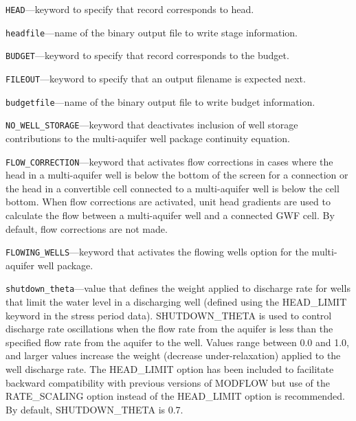 \begin{description}
\item \texttt{HEAD}---keyword to specify that record corresponds to head.

\item \texttt{headfile}---name of the binary output file to write stage information.

\item \texttt{BUDGET}---keyword to specify that record corresponds to the budget.

\item \texttt{FILEOUT}---keyword to specify that an output filename is expected next.

\item \texttt{budgetfile}---name of the binary output file to write budget information.

\item \texttt{NO\_WELL\_STORAGE}---keyword that deactivates inclusion of well storage contributions to the multi-aquifer well package continuity equation.

\item \texttt{FLOW\_CORRECTION}---keyword that activates flow corrections in cases where the head in a multi-aquifer well is below the bottom of the screen for a connection or the head in a convertible cell connected to a multi-aquifer well is below the cell bottom. When flow corrections are activated, unit head gradients are used to calculate the flow between a multi-aquifer well and a connected GWF cell. By default, flow corrections are not made.

\item \texttt{FLOWING\_WELLS}---keyword that activates the flowing wells option for the multi-aquifer well package.

\item \texttt{shutdown\_theta}---value that defines the weight applied to discharge rate for wells that limit the water level in a discharging well (defined using the HEAD\_LIMIT keyword in the stress period data). SHUTDOWN\_THETA is used to control discharge rate oscillations when the flow rate from the aquifer is less than the specified flow rate from the aquifer to the well. Values range between 0.0 and 1.0, and larger values increase the weight (decrease under-relaxation) applied to the well discharge rate. The HEAD\_LIMIT option has been included to facilitate backward compatibility with previous versions of MODFLOW but use of the RATE\_SCALING option instead of the HEAD\_LIMIT option is recommended. By default, SHUTDOWN\_THETA is 0.7.


\end{description}
